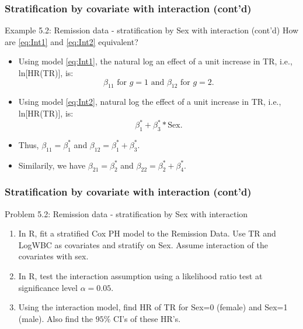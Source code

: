 \documentclass{beamer}
\theoremstyle{definition}
\begin{document}
\begin{frame}
\frametitle{Stratification by covariate with interaction (cont'd)}
\begin{block}{Example 5.2: Remission data - stratification by Sex with interaction (cont'd)}
How are \eqref{eq:Int1} and \eqref{eq:Int2} equivalent?
\begin{itemize}
\item Using model \eqref{eq:Int1}, the natural log an effect of a unit increase in TR, i.e., ln[HR(TR)], is:
\[ \beta_{11} \text{ for } g=1 \text{ and }  \beta_{12} \text{ for } g=2.
\]
\item Using model \eqref{eq:Int2}, natural log the effect of a unit increase in TR, i.e., ln[HR(TR)], is:
\[
\beta_{1}^* + \beta_{3}^**\text{Sex}.
\]
\item Thus, $\beta_{11}=\beta_{1}^*$ and  $\beta_{12}=\beta_{1}^*+\beta_{3}^*$.
\item Similarily, we have $\beta_{21}=\beta_{2}^*$ and  $\beta_{22}=\beta_{2}^*+\beta_{4}^*$.
\end{itemize}
\end{block}
\end{frame}

\begin{frame}
\frametitle{Stratification by covariate with interaction (cont'd)}
\begin{block}{Problem 5.2: Remission data - stratification by Sex with interaction}
\begin{enumerate}
\item In R, fit a stratified Cox PH model to the Remission Data. Use TR and LogWBC as covariates and stratify on Sex. Assume interaction of the covariates with sex.
\item In R, test the interaction assumption using a likelihood ratio test at significance level $\alpha=0.05$.
\item Using the interaction model, find HR of TR for Sex=0 (female) and Sex=1 (male). Also find the $95\%$ CI's of these HR's.
\end{enumerate}
\end{block}
\end{frame}
\end{document}
